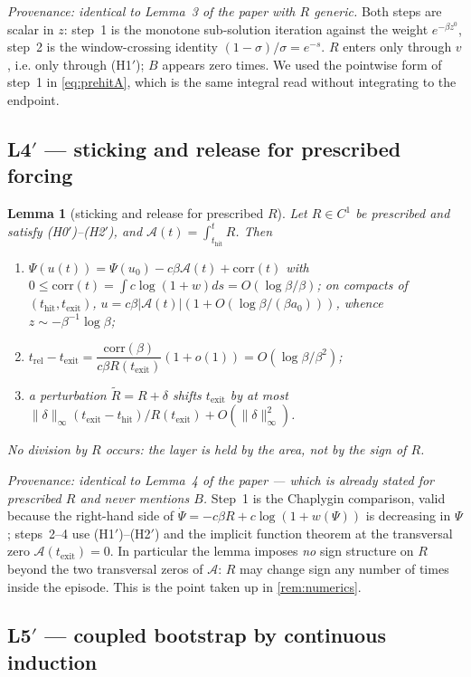 \documentclass[11pt]{article}
\newtheorem{lemma}{Lemma}
\theoremstyle{definition}
\theoremstyle{remark}
\newcommand{\thit}{t_{\mathrm{hit}}}
\newcommand{\texit}{t_{\mathrm{exit}}}
\newcommand{\trel}{t_{\mathrm{rel}}}
\newcommand{\Ar}{\mathcal{A}}
\begin{document}
\noindent\emph{Provenance: identical to Lemma~3 of the paper with $R$ generic.}
Both steps are scalar in $z$: step~1 is the monotone sub-solution iteration
against the weight $e^{-\beta z^0}$, step~2 is the window-crossing identity
$(1-\sigma)/\sigma=e^{-s}$. $R$ enters only through $v$, i.e. only through
(H1$'$); $B$ appears zero times. We used the pointwise form of step~1 in
\eqref{eq:prehitA}, which is the same integral read without integrating to the
endpoint.

\subsection*{L4$'$ --- sticking and release for prescribed forcing}

\begin{lemma}[sticking and release for prescribed $R$]\label{lem:release}
Let $R\in C^1$ be prescribed and satisfy \textup{(H0$'$)--(H2$'$)}, and
$\Ar(t)=\int_{\thit}^tR$. Then
\begin{enumerate}
\item[(i)] $\Psi(u(t))=\Psi(u_0)-c\beta\Ar(t)+\mathrm{corr}(t)$ with
$0\le\mathrm{corr}(t)=\int c\log(1+w)ds=O(\log\beta/\beta)$; on compacts of
$(\thit,\texit)$, $u=c\beta|\Ar(t)|(1+O(\log\beta/(\beta a_0)))$, whence
$z\sim-\beta^{-1}\log\beta$;
\item[(ii)] $\trel-\texit=\dfrac{\mathrm{corr}(\beta)}{c\beta R(\texit)}(1+o(1))
=O(\log\beta/\beta^2)$;
\item[(iii)] a perturbation $\tilde R=R+\delta$ shifts $\texit$ by at most
$\|\delta\|_\infty(\texit-\thit)/R(\texit)+O(\|\delta\|_\infty^2)$.
\end{enumerate}
No division by $R$ occurs: the layer is held by the area, not by the sign of $R$.
\end{lemma}

\noindent\emph{Provenance: identical to Lemma~4 of the paper --- which is already
stated for prescribed $R$ and never mentions $B$.} Step~1 is the Chaplygin
comparison, valid because the right-hand side of
$\dot\Psi=-c\beta R+c\log(1+w(\Psi))$ is decreasing in $\Psi$; steps~2--4 use
(H1$'$)--(H2$'$) and the implicit function theorem at the transversal zero
$\Ar(\texit)=0$. In particular the lemma imposes \emph{no} sign structure on $R$
beyond the two transversal zeros of $\Ar$: $R$ may change sign any number of
times inside the episode. This is the point taken up in \cref{rem:numerics}.

\subsection*{L5$'$ --- coupled bootstrap by continuous induction}
\end{document}
